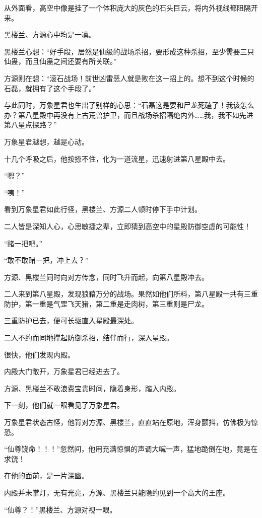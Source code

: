 \begin{this_body}
从外面看，高空中像是挂了一个体积庞大的灰色的石头巨云，将内外视线都阻隔开来。

黑楼兰、方源心中均是一凛。

黑楼兰心想：“好手段，居然是仙级的战场杀招，要形成这种杀招，至少需要三只仙蛊，而且仙蛊之间还要有所关联。”

方源则在想：“滚石战场！前世凶雷恶人就是败在这一招上的。想不到这个时候的石磊，就拥有了这个手段了。”

与此同时，万象星君也生出了别样的心思：“石磊这是要和尸龙死磕了！我该怎么办？第八星殿中再没有上古荒兽护卫，而且战场杀招隔绝内外……我，我不如先进第八星点探路？”

万象星君越想，越是心动。

十几个呼吸之后，他按捺不住，化为一道流星，迅速射进第八星殿中去。

“嗯？”

“咦！”

看到万象星君如此行径，黑楼兰、方源二人顿时停下手中计划。

二人皆是深知人心，心思敏捷之辈，立即猜到高空中的星殿防御空虚的可能性！

“赌一把吧。”

“敢不敢赌一把，冲上去？”

方源、黑楼兰同时向对方传念，同时飞升而起，向第八星殿冲去。

二人来到第八星殿，发现狼藉万分的战场。果然如他们所料，第八星殿一共有三重防护，第一重是气罡飞天猪，第二重是走肉树，第三重则是尸龙。

三重防护已去，便可长驱直入星殿最深处。

二人不约而同地撑起防御杀招，结伴而行，深入星殿。

很快，他们发现内殿。

内殿大门敞开，万象星君已经进去了。

方源、黑楼兰不敢浪费宝贵时间，隐着身形，踏入内殿。

下一刻，他们就一眼看见了万象星君。

万象星君状态古怪，他背对方源、黑楼兰，直直站在原地，浑身颤抖，仿佛极为惊恐。

“仙尊饶命！！！”忽然间，他用充满惊惧的声调大喊一声，猛地跪倒在地，竟是在求饶！

在他的面前，是一片深幽。

内殿并未掌灯，无有光亮，方源、黑楼兰只能隐约见到一个高大的王座。

“仙尊？！”黑楼兰、方源对视一眼。


\end{this_body}
